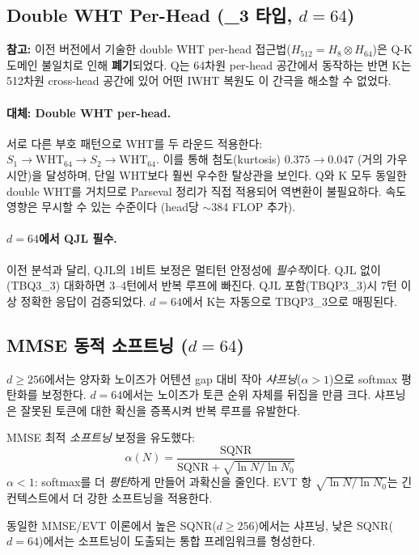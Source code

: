 \documentclass[10pt,twocolumn]{article}
\begin{document}
\subsection{Double WHT Per-Head (\_3 타입, $d=64$)}

\textbf{참고:} 이전 버전에서 기술한 double WHT per-head 접근법($H_{512} = H_8 \otimes H_{64}$)은 Q-K 도메인 불일치로 인해 \textbf{폐기}되었다. Q는 64차원 per-head 공간에서 동작하는 반면 K는 512차원 cross-head 공간에 있어 어떤 IWHT 복원도 이 간극을 해소할 수 없었다.

\paragraph{대체: Double WHT per-head.} 서로 다른 부호 패턴으로 WHT를 두 라운드 적용한다: $S_1 \to \text{WHT}_{64} \to S_2 \to \text{WHT}_{64}$. 이를 통해 첨도(kurtosis) $0.375 \to 0.047$ (거의 가우시안)을 달성하며, 단일 WHT보다 훨씬 우수한 탈상관을 보인다. Q와 K 모두 동일한 double WHT를 거치므로 Parseval 정리가 직접 적용되어 역변환이 불필요하다. 속도 영향은 무시할 수 있는 수준이다 (head당 $\sim$384 FLOP 추가).

\paragraph{$d=64$에서 QJL 필수.} 이전 분석과 달리, QJL의 1비트 보정은 멀티턴 안정성에 \emph{필수적}이다. QJL 없이(TBQ3\_3) 대화하면 3--4턴에서 반복 루프에 빠진다. QJL 포함(TBQP3\_3)시 7턴 이상 정확한 응답이 검증되었다. $d=64$에서 K는 자동으로 TBQP3\_3으로 매핑된다.

\subsection{MMSE 동적 소프트닝 ($d=64$)}

$d \geq 256$에서는 양자화 노이즈가 어텐션 gap 대비 작아 \emph{샤프닝}($\alpha > 1$)으로 softmax 평탄화를 보정한다. $d=64$에서는 노이즈가 토큰 순위 자체를 뒤집을 만큼 크다. 샤프닝은 잘못된 토큰에 대한 확신을 증폭시켜 반복 루프를 유발한다.

MMSE 최적 \emph{소프트닝} 보정을 유도했다:
\begin{equation}
\alpha(N) = \frac{\text{SQNR}}{\text{SQNR} + \sqrt{\ln N / \ln N_0}}
\end{equation}
$\alpha < 1$: softmax를 더 \emph{평탄}하게 만들어 과확신을 줄인다. EVT 항 $\sqrt{\ln N / \ln N_0}$는 긴 컨텍스트에서 더 강한 소프트닝을 적용한다.

동일한 MMSE/EVT 이론에서 높은 SQNR($d \geq 256$)에서는 샤프닝, 낮은 SQNR($d = 64$)에서는 소프트닝이 도출되는 통합 프레임워크를 형성한다.
\end{document}

